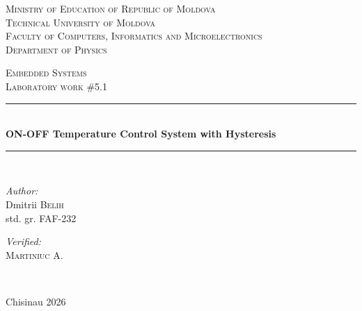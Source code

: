 \documentclass[12pt]{article}
\begin{document}
\begin{titlepage}
    \thispagestyle{empty}

    \begin{center}
        \textsc{\large Ministry of Education of Republic of Moldova}\\[0.5cm]
        \textsc{\large Technical University of Moldova}\\[0.5cm]
        \textsc{\large Faculty of Computers, Informatics and Microelectronics}\\[0.5cm]
        \textsc{\large Department of Physics}\\[1.2cm]
    \end{center}

    \vspace{25mm}

    \begin{center}
        \textsc{\Large Embedded Systems}\\[0.5cm]
        \textsc{\large Laboratory work \#5.1}\\[0.5cm]

        \newcommand{\HRule}{\rule{\linewidth}{0.5mm}}
        \vspace{10mm}
        \HRule \\[0.4cm]
        { \LARGE \bfseries ON-OFF Temperature Control System with Hysteresis}\\[0.4cm]
        \HRule \\[1.5cm]
    \end{center}

    \vspace{10mm}

    \begin{minipage}[t]{0.4\textwidth}
        \begin{flushleft} \large
            \emph{Author:} \\
            Dmitrii \textsc{Belih}\\
            std. gr. FAF-232
        \end{flushleft}
    \end{minipage}
    \hfill
    \begin{minipage}[t]{0.4\textwidth}
        \begin{flushright} \large
            \emph{Verified:} \\
            \textsc{Martiniuc} A.\\
        \end{flushright}
    \end{minipage}\\[3cm]

    \vspace{5mm}
    \begin{center}
        \large Chisinau 2026 \\[0.5cm]
    \end{center}

    \vfill
\end{titlepage}
\end{document}
